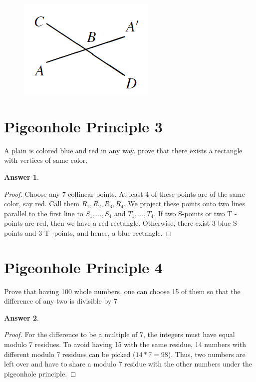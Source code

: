 \documentclass[a4paper]{article}
\renewcommand{\(}{\left(}
\renewcommand{\)}{\right)}
\theoremstyle{plain}
\theoremstyle{plain}
\theoremstyle{definition}
\newtheorem*{answer}{Answer}
\begin{document}
\begin{figure}[h]
\centering
\includegraphics{Problem4Fig1}
\caption{}\label{Problem4Fig1}
\end{figure}

\section{Pigeonhole Principle 3}
A plain is colored blue  and red in any way. prove that there exists a rectangle with vertices of same color.

\begin{shaded}
\begin{answer}
\begin{proof}
Choose any 7 collinear points. At least 4 of these points are of the same color, say
red. Call them $ R_1, R_2, R_3, R_4 $. We project these points onto two lines parallel to the
first line to $S_1, \dots , S_4 $ and $T_1, \dots , T_4$. If two S-points or two T -points are red, then
we have a red rectangle. Otherwise, there exist 3 blue S-points and 3 T -points, and
hence, a blue rectangle.
\end{proof}
\end{answer}
\end{shaded}

\section{Pigeonhole Principle 4}
Prove that having 100 whole numbers, one can choose 15 of them so that the difference of any two is divisible by 7
\begin{shaded}
\begin{answer}
\begin{proof}
For the difference to be a multiple of 7, the integers must have equal modulo 7 residues. To avoid having 15 with the same residue, 14 numbers with different modulo 7 residues can be picked ($14 * 7 = 98$). Thus, two numbers are left over and have to share a modulo 7 residue with the other numbers under the pigeonhole principle.
\end{proof}
\end{answer}
\end{shaded}
\end{document}
